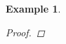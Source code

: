 \documentclass[a4paper, 10pt, final]{article}
\newtheorem{example}{Example}[section]
\begin{document}
\begin{example}
\begin{proof}






\end{proof}
\end{example}
\end{document}
